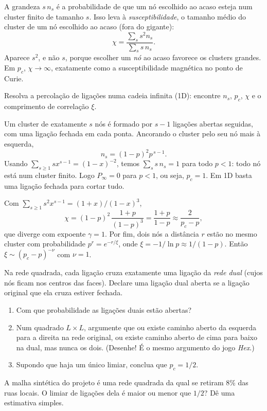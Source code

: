 \documentclass[11pt]{article}
\begin{document}
A grandeza $s\,n_s$ é a probabilidade de que um nó escolhido ao acaso esteja num cluster finito de tamanho $s$. Isso leva à \emph{susceptibilidade}, o tamanho médio do cluster de um nó escolhido ao acaso (fora do gigante):
\[
\chi = \frac{\sum_s s^2 n_s}{\sum_s s\,n_s}.
\]
Aparece $s^2$, e não $s$, porque escolher um \emph{nó} ao acaso favorece os clusters grandes. Em $p_c$, $\chi\to\infty$, exatamente como a susceptibilidade magnética no ponto de Curie.

\begin{exemplo}
Resolva a percolação de ligações numa cadeia infinita (1D): encontre $n_s$, $p_c$, $\chi$ e o comprimento de correlação $\xi$.
\end{exemplo}
\begin{solucao}
Um cluster de exatamente $s$ nós é formado por $s-1$ ligações abertas seguidas, com uma ligação fechada em cada ponta. Ancorando o cluster pelo seu nó mais à esquerda,
\[
n_s = (1-p)^2 p^{\,s-1}.
\]
Usando $\sum_{s\ge1} s x^{s-1} = (1-x)^{-2}$, temos $\sum_s s\,n_s = 1$ para todo $p<1$: todo nó está num cluster finito. Logo $P_\infty=0$ para $p<1$, ou seja, $p_c = 1$. Em 1D basta uma ligação fechada para cortar tudo.

Com $\sum_{s\ge 1}s^2x^{s-1} = (1+x)/(1-x)^3$,
\[
\chi = (1-p)^2\,\frac{1+p}{(1-p)^3} = \frac{1+p}{1-p} \approx \frac{2}{p_c-p},
\]
que diverge com expoente $\gamma = 1$. Por fim, dois nós a distância $r$ estão no mesmo cluster com probabilidade $p^r = e^{-r/\xi}$, onde $\xi = -1/\ln p \approx 1/(1-p)$. Então $\xi \sim (p_c-p)^{-\nu}$ com $\nu = 1$.
\end{solucao}

 Na rede quadrada, cada ligação cruza exatamente uma ligação da \emph{rede dual} (cujos nós ficam nos centros das faces). Declare uma ligação dual aberta se a ligação original que ela cruza estiver fechada.
\begin{enumerate}
  \item Com que probabilidade as ligações duais estão abertas?
  \item Num quadrado $L\times L$, argumente que ou existe caminho aberto da esquerda para a direita na rede original, ou existe caminho aberto de cima para baixo na dual, mas nunca os dois. (Desenhe! É o mesmo argumento do jogo \emph{Hex}.)
  \item Supondo que haja um único limiar, conclua que $p_c = 1/2$.
\end{enumerate}

 A malha sintética do projeto é uma rede quadrada da qual se retiram 8\% das ruas locais. O limiar de ligações dela é maior ou menor que $1/2$? Dê uma estimativa simples.
\end{document}
